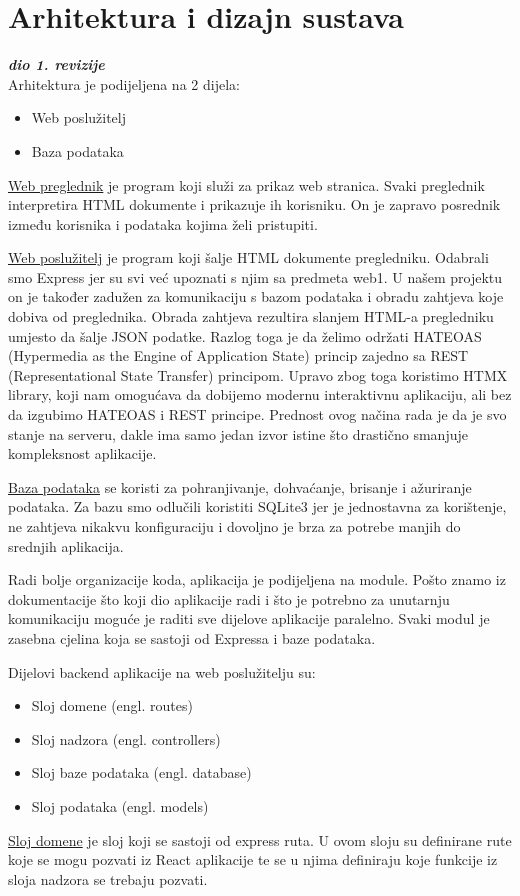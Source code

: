 \chapter{Arhitektura i dizajn sustava}
		
		\textbf{\textit{dio 1. revizije}}\\

\noindent Arhitektura je podijeljena na 2 dijela:
\begin{itemize}
  \item Web poslužitelj
  \item Baza podataka
\end{itemize}

\underline{Web preglednik} je program koji služi za prikaz web stranica. Svaki preglednik interpretira HTML dokumente i prikazuje ih korisniku. On je zapravo posrednik između korisnika i podataka kojima želi pristupiti.\hfill \break

\underline{Web poslužitelj} je program koji šalje HTML dokumente pregledniku. 
Odabrali smo Express jer su svi već upoznati s njim sa predmeta web1. 
U našem projektu on je također zadužen za komunikaciju s bazom podataka i obradu zahtjeva koje dobiva od preglednika. Obrada zahtjeva rezultira slanjem HTML-a pregledniku umjesto da šalje JSON podatke. Razlog toga je da želimo održati HATEOAS (Hypermedia as the Engine of Application State) princip zajedno sa REST (Representational State Transfer) principom. Upravo zbog toga koristimo HTMX library, koji nam omogućava da dobijemo modernu interaktivnu aplikaciju, ali bez da izgubimo HATEOAS i REST principe. Prednost ovog načina rada je da je svo stanje na serveru, 
dakle ima samo jedan izvor istine što drastično smanjuje kompleksnost aplikacije.\hfill \break

\underline{Baza podataka} se koristi za pohranjivanje, dohvaćanje, brisanje i ažuriranje podataka. Za bazu smo odlučili koristiti SQLite3 jer je jednostavna za korištenje, ne zahtjeva nikakvu konfiguraciju i dovoljno je brza za potrebe manjih do srednjih aplikacija.\hfill \break

Radi bolje organizacije koda, aplikacija je podijeljena na module. Pošto znamo iz dokumentacije što koji dio aplikacije radi i što je potrebno za unutarnju komunikaciju moguće je raditi sve dijelove aplikacije paralelno. Svaki modul je zasebna cjelina koja se sastoji od Expressa i baze podataka.\hfill \break

Dijelovi backend aplikacije na web poslužitelju su:
\begin{itemize}
  \item Sloj domene (engl. routes)
  \item Sloj nadzora (engl. controllers)
  \item Sloj baze podataka (engl. database)
  \item Sloj podataka (engl. models)
\end{itemize}
\hfill \break
\underline{Sloj domene} je sloj koji se sastoji od express ruta. U ovom sloju su definirane rute koje se mogu pozvati iz React aplikacije te se u njima definiraju koje funkcije iz sloja nadzora se trebaju pozvati.\hfill \break

